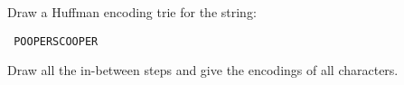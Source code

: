 Draw a Huffman encoding trie for the string:
\begin{center}\tt
POOPERSCOOPER
\end{center}
Draw all the in-between steps and give the encodings of all characters.
